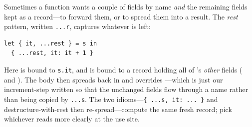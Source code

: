Sometimes a function wants a couple of fields by name \emph{and} the remaining
fields kept as a record---to forward them, or to spread them into a result. The
\emph{rest} pattern, written \lstinline[style=l4style]|...r|, captures whatever is
left:

\begin{lstlisting}[style=l4style]
let { it, ...rest } = s in
  { ...rest, it: it + 1 }
\end{lstlisting}

Here  is bound to \lstinline[style=l4style]|s.it|, and  is
bound to a record holding all of 's \emph{other} fields ( and
). The body then spreads  back in and overrides
---which is just our increment-step written so that the unchanged fields
flow through a name rather than being copied by \lstinline[style=l4style]|...s|.
The two idioms---\lstinline[style=l4style]|{ ...s, it: ... }| and destructure-with-rest
then re-spread---compute the same fresh record; pick whichever reads more clearly
at the use site.

